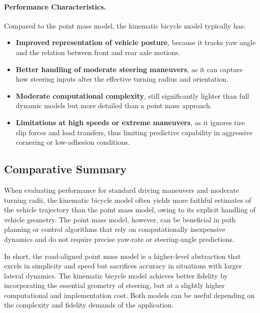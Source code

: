 \paragraph{Performance Characteristics.}
Compared to the point mass model, the kinematic bicycle model typically has:
\begin{itemize}
	\item \textbf{Improved representation of vehicle posture}, because it
	      tracks yaw angle and the relation between front and rear axle motions.
	\item \textbf{Better handling of moderate steering maneuvers}, as it
	      can capture how steering inputs alter the effective turning radius
	      and orientation.
	\item \textbf{Moderate computational complexity}, still significantly
	      lighter than full dynamic models but more detailed than
	      a point mass approach.
	\item \textbf{Limitations at high speeds or extreme maneuvers}, as it
	      ignores tire slip forces and load transfers, thus limiting
	      predictive capability in aggressive cornering or low-adhesion
	      conditions.
\end{itemize}

\subsection*{Comparative Summary}

When evaluating performance for standard driving maneuvers and moderate turning radii, the kinematic bicycle model often yields more faithful
estimates of the vehicle trajectory than the point mass model, owing to its explicit handling of vehicle geometry.
The point mass model, however, can be beneficial in path planning or control algorithms that rely on computationally inexpensive dynamics and do not
require precise yaw-rate or steering-angle predictions.

In short, the road-aligned point mass model is a higher-level abstraction that excels in simplicity and speed but sacrifices accuracy in situations
with larger lateral dynamics.
The kinematic bicycle model achieves better fidelity by incorporating the essential geometry of steering, but at a slightly higher computational and
implementation cost.
Both models can be useful depending on the complexity and fidelity demands of the application.
